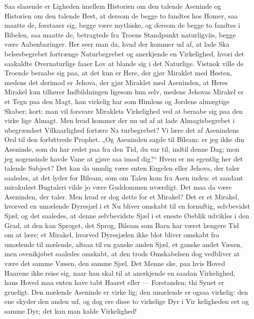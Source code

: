 \documentclass[12pt]{book}
\newcommand{\opage}[1]{\marginnote{\footnotesize\textit{[#1]}}}
\begin{document}
Saa slaaende er Ligheden imellem Historien om
den talende Aseninde og Historien om den talende Hest,
at dersom de begge to fandtes hos Homer, saa maatte
de, forstaaer sig, begge være mythiske, og dersom de
begge to fandtes i Bibelen, saa maatte de, betragtede fra
Troens Standpunkt naturligviis, begge være Aabenbaringer.
Her seer man da, hvad der kommer ud af, at lade Ska\-%
belsesbegrebet fortrænge Naturbegrebet og anerkjende en
Virkelighed, hvori det saakaldte Overnaturlige faaer Lov
at blande sig i det Naturlige. Vistnok ville de Troende
beraabe sig paa, at det kun er Here, der gjør Miraklet
med Hesten, medens det derimod er Jehova, der gjør
Miraklet med Aseninden, at Heres Mirakel kun tilhører
Indbildningen ligesom hun selv, medens Jehovas Mirakel
er et Tegn paa den Magt, han virkelig har som Himlens
og Jordens almægtige Skaber; kort: man vil forsvare
Miraklets Virkelighed ved at beraabe sig paa den virke\-%
lige Almagt. Men hvad kommer der nu ud af at lade
Almagtsbegrebet i ubegrændset Vilkaarlighed fortære Na\-%
turbegrebet? Vi lære det af Asenindens Ord til den
forbittrede Prophet. „Og Aseninden sagde til Bileam:
er jeg ikke din Aseninde, som du har redet paa fra den
Tid, du var til, indtil denne Dag; mon jeg nogensinde
\opage{159}\setcounter{footnote}{0}%
havde Vane at gjøre saa imod dig?“ Hvem er nu
egentlig her det talende Subject? Det kan da umulig
være enten Engelen eller Jehova, der taler saaledes,
at det lyder for Bileam, som om Talen kom fra Asen\-%
inden: et saadant mirakuløst Bugtaleri vilde jo være
Guddommen uværdigt. Det maa da være Aseninden,
der taler. Men hvad er dog dette for et Mirakel? Det
er et Mirakel, hvorved en umælende Dyresjæl i et Nu
bliver omskabt til en fornuftig, selvbevidst Sjæl; og det
saaledes, at denne selvbevidste Sjæl i et eneste Øieblik
udvikles i den Grad, at den kan Sproget, det Sprog,
Bileam som Barn har været længere Tid om at lære; et
Mirakel, hvorved Dyresjælen ikke blot bliver omskabt
fra umælende til mælende, altsaa til en ganske anden
Sjæl, et ganske andet Væsen, men ovenikjøbet saaledes
omskabt, at den trods Omskabelsen dog vedbliver at
være det samme Væsen, den samme Sjæl. Det Menne\-%
ske, paa hvis Hoved Haarene ikke reise sig, naar han
skal til at anerkjende en saadan Virkelighed, hans Hoved
maa enten have tabt Haaret eller --- Forstanden;
thi Synet er grueligt. Den mælende Aseninde er virke\-%
lig; den umælende er ogsaa virkelig: den ene skyder
den anden ud, og dog ere disse to virkelige Dyr i Vir\-%
keligheden eet og samme Dyr; det kan man kalde
Virkelighed!
\end{document}
